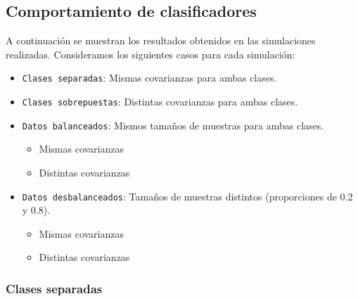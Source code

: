 \documentclass[10pt]{article}
\begin{document}
\subsection*{Comportamiento de clasificadores}

A continuación se muestran los resultados obtenidos en las simulaciones
realizadas. Consideramos los siguientes casos para cada simulación:

\begin{itemize}
    \item \texttt{Clases separadas}: Mismas covarianzas para ambas clases.
    \item \texttt{Clases sobrepuestas}: Distintas covarianzas para ambas clases.
    \item \texttt{Datos balanceados}: Mismos tamaños de muestras para ambas
    clases.
    \begin{itemize}
        \item Mismas covarianzas
        \item Distintas covarianzas
    \end{itemize}
    \item \texttt{Datos desbalanceados}: Tamaños de muestras distintos
    (proporciones de 0.2 y 0.8).
    \begin{itemize}
        \item Mismas covarianzas
        \item Distintas covarianzas
    \end{itemize}
\end{itemize}


\subsubsection*{Clases separadas}
\end{document}
